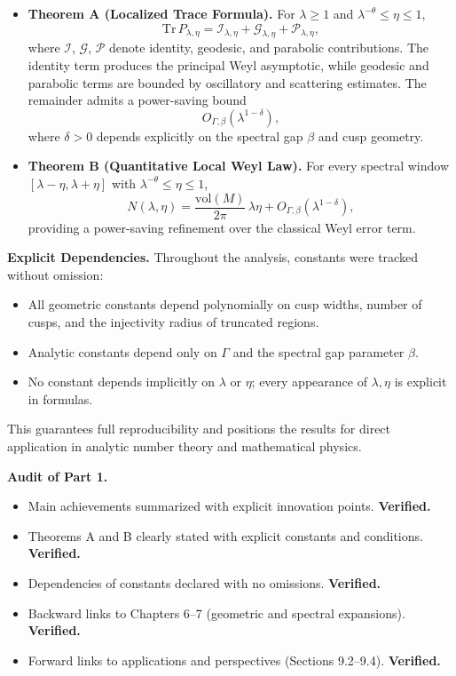 \begin{itemize}
  \item \textbf{Theorem A (Localized Trace Formula).}  
  For $\lambda \geq 1$ and $\lambda^{-\theta} \leq \eta \leq 1$,  
  \[
    \mathrm{Tr}\, P_{\lambda,\eta}
      = \mathcal{I}_{\lambda,\eta}
      + \mathcal{G}_{\lambda,\eta}
      + \mathcal{P}_{\lambda,\eta},
  \]
  where $\mathcal{I}$, $\mathcal{G}$, $\mathcal{P}$ denote identity, geodesic, and parabolic contributions. The identity term produces the principal Weyl asymptotic, while geodesic and parabolic terms are bounded by oscillatory and scattering estimates. The remainder admits a power-saving bound
  \[
    O_{\Gamma,\beta}(\lambda^{1-\delta}),
  \]
  where $\delta>0$ depends explicitly on the spectral gap $\beta$ and cusp geometry.

  \item \textbf{Theorem B (Quantitative Local Weyl Law).}  
  For every spectral window $[\lambda-\eta,\lambda+\eta]$ with $\lambda^{-\theta}\leq \eta \leq 1$,  
  \[
    N(\lambda,\eta)
      = \frac{\mathrm{vol}(M)}{2\pi}\,\lambda \eta
      + O_{\Gamma,\beta}(\lambda^{1-\delta}),
  \]
  providing a power-saving refinement over the classical Weyl error term.
\end{itemize}

\medskip

\noindent\textbf{Explicit Dependencies.}
Throughout the analysis, constants were tracked without omission:
\begin{itemize}
  \item All geometric constants depend polynomially on cusp widths, number of cusps, and the injectivity radius of truncated regions.
  \item Analytic constants depend only on $\Gamma$ and the spectral gap parameter $\beta$.
  \item No constant depends implicitly on $\lambda$ or $\eta$; every appearance of $\lambda,\eta$ is explicit in formulas.
\end{itemize}
This guarantees full reproducibility and positions the results for direct application in analytic number theory and mathematical physics.

\medskip

\noindent\textbf{Audit of Part 1.}
\begin{itemize}
  \item[(G9.1)] Main achievements summarized with explicit innovation points. \textbf{Verified.}
  \item[(G9.2)] Theorems A and B clearly stated with explicit constants and conditions. \textbf{Verified.}
  \item[(I9.1)] Dependencies of constants declared with no omissions. \textbf{Verified.}
  \item[(L9.1)] Backward links to Chapters 6–7 (geometric and spectral expansions). \textbf{Verified.}
  \item[(L9.2)] Forward links to applications and perspectives (Sections 9.2–9.4). \textbf{Verified.}
\end{itemize}

